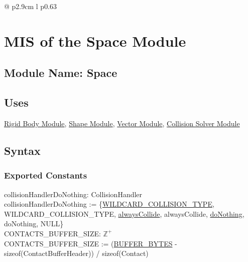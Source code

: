 \documentclass[12pt]{article}
\newcommand{\colDescrip}{0.63\textwidth}
\newcommand{\newfunc}{\\[1.5em]}
\newcommand{\UZ}{$\mathbb{Z}^+$}
\newcommand{\Body}{\hyperref[MISBody]{Rigid Body Module}}
\newcommand{\Shape}{\hyperref[MISShape]{Shape Module}}
\newcommand{\Vector}{\hyperref[MISVector]{Vector Module}}
\newcommand{\Collision}{\hyperref[MISCollision]{Collision Solver Module}}
\begin{document}
\begin{longtable*}{@{} p{2.9cm} l p{\colDescrip}}
\end{longtable*}
	

\section{MIS of the Space Module} \label{MISSpace}

\subsection{Module Name: Space}

\subsection{Uses} \label{SecUSpace}
	\Body, \Shape, \Vector, \Collision

\subsection{Syntax}

\subsubsection{Exported Constants} \label{SecECSpace}
	collisionHandlerDoNothing: CollisionHandler \\
	collisionHandlerDoNothing := \{\hyperref[SecECControl]{WILDCARD_COLLISION_TYPE}, WILDCARD_COLLISION_TYPE, \hyperref[SecLFSpace]{alwaysCollide}, alwaysCollide, \hyperref[SecLFSpace]{doNothing}, doNothing, NULL\} \\
	\newline
	CONTACTS_BUFFER_SIZE: \UZ \\
	CONTACTS_BUFFER_SIZE := (\hyperref[SecECControl]{BUFFER_BYTES} - sizeof(ContactBufferHeader)) / sizeof(Contact)
	
\end{document}
